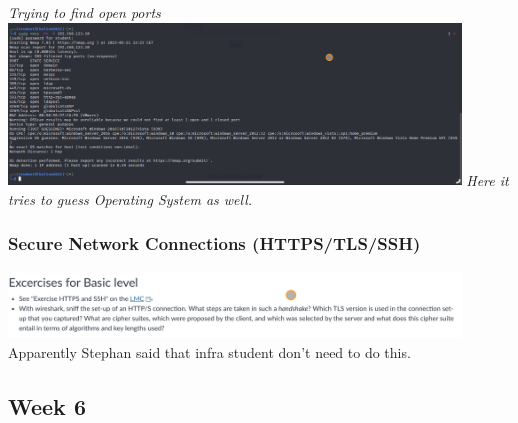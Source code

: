 \documentclass[12pt, letterpaper]{article}
\begin{document}
\break
\emph{Trying to find open ports}
\hfill\break
\hfill\break
\includegraphics[width=0.9\textwidth]{fotos/Week 5/Guessing windows nmap.jpeg}
\break
\emph{Here it tries to guess Operating System as well.}
\newpage
\subsubsection{Secure Network Connections (HTTPS/TLS/SSH)}
\includegraphics[width=0.9\textwidth]{fotos/Week 5/Secure Network Connections.jpeg}
\hfill\break
\hfill\break
Apparently Stephan said that infra student don't need to do this.
\hfill\break
\hfill\break

\newpage
\subsection{Week 6}
\end{document}
